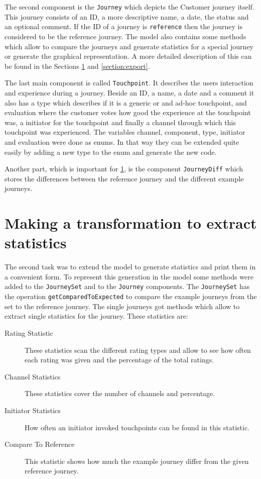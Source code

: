 \documentclass[12pt]{scrartcl}
\begin{document}
The second component is the \lstinline!Journey! which depicts the Customer journey itself. This journey consists of 
an ID, a more descriptive name, a date, the status and  an optional comment. If the ID of a journey is 
\lstinline!reference! then the journey is considered to be the reference journey. The model also contains some 
methods which allow to compare the journeys and generate statistics for a special journey or generate the graphical
representation. A more detailed description of this can be found in the Sections \ref{section:statistic} and
\ref{section:export}.

The last main component is called \lstinline!Touchpoint!. It describes the users interaction and experience during
a journey. Beside an ID, a name, a date and a comment it also has a type which describes if it is a generic or
and ad-hoc touchpoint, and evaluation where the customer votes how good the experience at the touchpoint was, a 
initiator for the touchpoint and finally a channel through which this touchpoint was experienced. The variables
channel, component, type, initiator and evaluation were done as enums. In that way they can be extended quite
easily by adding a new type to the enum and generate the new code.

Another part, which is important for \ref{section:statistic}, is the component \lstinline!JourneyDiff! which stores
the differences between the reference journey and the different example journeys.

\section{Making a transformation to extract statistics} 
\label{section:statistic}

The second task was to extend the model to generate statistics and print them in a convenient form. To represent
this generation in the model some methods were added to the \lstinline!JourneySet! and to the \lstinline!Journey!
components. The \lstinline!JourneySet! has the operation \lstinline!getComparedToExpected! to compare the example 
journeys from the set to the reference journey. The single journeys got methods which allow to extract single
statistics for the journey. These statistics are:
\begin{description}
	\item[Rating Statistic] These statistics scan the different rating types and allow to see how often each rating
	was given and the percentage of the total ratings.
	\item[Channel Statistics] These statistics cover the number of channels and percentage.
	\item[Initiator Statistics] How often an initiator invoked touchpoints can be found in this statistic.
	\item[Compare To Reference] This statistic shows how much the example journey differ from the given reference
	journey.
\end{description}
\end{document}
